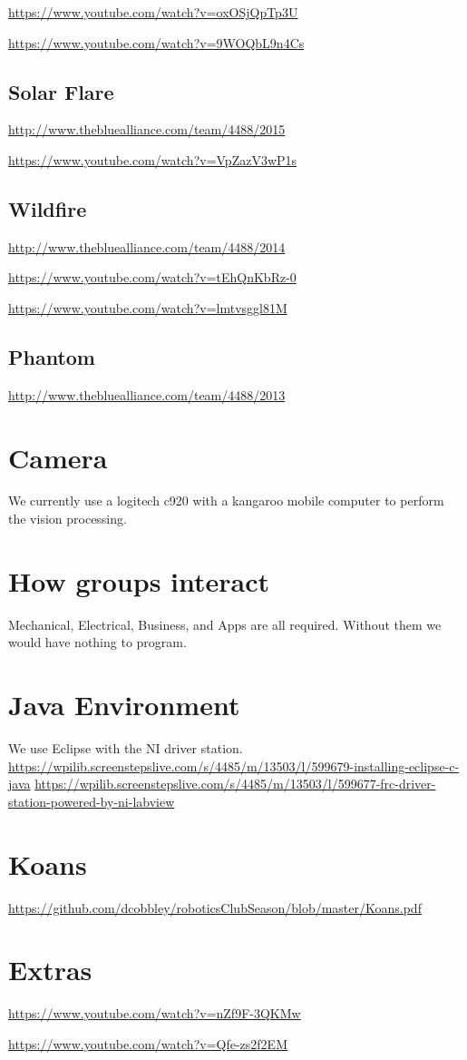 \documentclass{article}
\begin{document}
\url{https://www.youtube.com/watch?v=oxOSjQpTp3U}

\url{https://www.youtube.com/watch?v=9WOQbL9n4Cs}
\subsection{Solar Flare}
\url{http://www.thebluealliance.com/team/4488/2015}

\url{https://www.youtube.com/watch?v=VpZazV3wP1s}
\subsection{Wildfire}
\url{http://www.thebluealliance.com/team/4488/2014}

\url{https://www.youtube.com/watch?v=tEhQnKbRz-0}

\url{https://www.youtube.com/watch?v=lmtvsggl81M}
\subsection{Phantom}
\url{http://www.thebluealliance.com/team/4488/2013}



\section{Camera}
We currently use a logitech c920 with a kangaroo mobile computer to perform the vision processing.

\section{How groups interact}
Mechanical, Electrical, Business, and Apps are all required. Without them we would have nothing to program.

\section{Java Environment}
We use Eclipse with the NI driver station.
\url{https://wpilib.screenstepslive.com/s/4485/m/13503/l/599679-installing-eclipse-c-java}
\url{https://wpilib.screenstepslive.com/s/4485/m/13503/l/599677-frc-driver-station-powered-by-ni-labview}

\section{Koans}
\url{https://github.com/dcobbley/roboticsClubSeason/blob/master/Koans.pdf
}
\section{Extras}
\url{https://www.youtube.com/watch?v=nZf9F-3QKMw}

\url{https://www.youtube.com/watch?v=Qfe-zs2f2EM}
\end{document}
